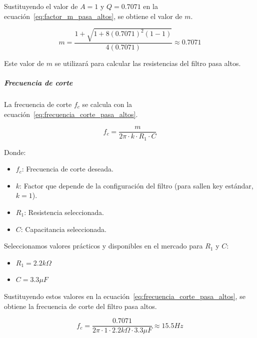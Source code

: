                     Sustituyendo el valor de $A = 1$ y $Q = 0.7071$ en la ecuación~\ref{eq:factor_m_pasa_altos}, se obtiene el valor de $m$.

                    \begin{equation}
                        \label{eq:factor_m_pasa_altos_valor}
                        m = \frac{1+\sqrt{1+8(0.7071)^2(1-1)}}{4(0.7071)} \approx 0.7071
                    \end{equation}

                    Este valor de $m$ se utilizará para calcular las resistencias del filtro pasa altos.

                \subparagraph{Frecuencia de corte}
                    La frecuencia de corte $f_c$ se calcula con la ecuación~\ref{eq:frecuencia_corte_pasa_altos}.

                    \begin{equation}
                        \label{eq:frecuencia_corte_pasa_altos}
                        f_c = \frac{m}{2\pi \cdot k \cdot R_1 \cdot C}
                    \end{equation}

                    Donde:

                    \begin{itemize}
                        \item $f_c$: Frecuencia de corte deseada.
                        \item $k$: Factor que depende de la configuración del filtro (para sallen key estándar, $k = 1$).
                        \item $R_1$: Resistencia seleccionada.
                        \item $C$: Capacitancia seleccionada.
                    \end{itemize}

                    Seleccionamos valores prácticos y disponibles en el mercado para $R_1$ y $C$:
                    \begin{itemize}
                        \item $R_1 = 2.2 k\Omega$
                        \item $C = 3.3 \mu F$
                    \end{itemize}

                    Sustituyendo estos valores en la ecuación~\ref{eq:frecuencia_corte_pasa_altos}, se obtiene la frecuencia de corte del filtro pasa altos.

                    \begin{equation}
                        \label{eq:frecuencia_corte_pasa_altos_valor}
                        f_c = \frac{0.7071}{2\pi \cdot 1 \cdot 2.2 k\Omega \cdot 3.3 \mu F} \approx 15.5 Hz
                    \end{equation}

